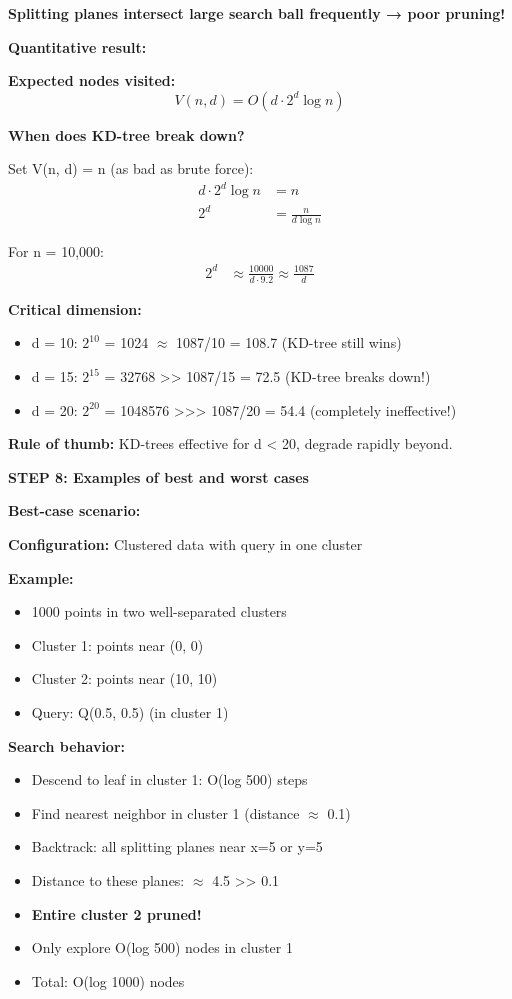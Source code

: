 \documentclass[12pt]{article}
\begin{document}
\begin{solution}
\textbf{Splitting planes intersect large search ball frequently → poor pruning!}

\textbf{Quantitative result:}

\textbf{Expected nodes visited:}
\[
V(n, d) = O(d \cdot 2^d \log n)
\]

\textbf{When does KD-tree break down?}

Set V(n, d) = n (as bad as brute force):
\begin{align*}
d \cdot 2^d \log n &= n \\
2^d &= \frac{n}{d \log n}
\end{align*}

For n = 10,000:
\begin{align*}
2^d &\approx \frac{10000}{d \cdot 9.2} \approx \frac{1087}{d}
\end{align*}

\textbf{Critical dimension:}
\begin{itemize}
    \item d = 10: $2^{10}$ = 1024 $\approx$ 1087/10 = 108.7 (KD-tree still wins)
    \item d = 15: $2^{15}$ = 32768 >> 1087/15 = 72.5 (KD-tree breaks down!)
    \item d = 20: $2^{20}$ = 1048576 >>> 1087/20 = 54.4 (completely ineffective!)
\end{itemize}

\textbf{Rule of thumb:} KD-trees effective for d < 20, degrade rapidly beyond.

\textbf{STEP 8: Examples of best and worst cases}

\textbf{Best-case scenario:}

\textbf{Configuration:} Clustered data with query in one cluster

\textbf{Example:}
\begin{itemize}
    \item 1000 points in two well-separated clusters
    \item Cluster 1: points near (0, 0)
    \item Cluster 2: points near (10, 10)
    \item Query: Q(0.5, 0.5) (in cluster 1)
\end{itemize}

\textbf{Search behavior:}
\begin{itemize}
    \item Descend to leaf in cluster 1: O(log 500) steps
    \item Find nearest neighbor in cluster 1 (distance $\approx$ 0.1)
    \item Backtrack: all splitting planes near x=5 or y=5
    \item Distance to these planes: $\approx$ 4.5 >> 0.1
    \item \textbf{Entire cluster 2 pruned!}
    \item Only explore O(log 500) nodes in cluster 1
    \item Total: O(log 1000) nodes \checkmark
\end{itemize}


\end{solution}
\end{document}
